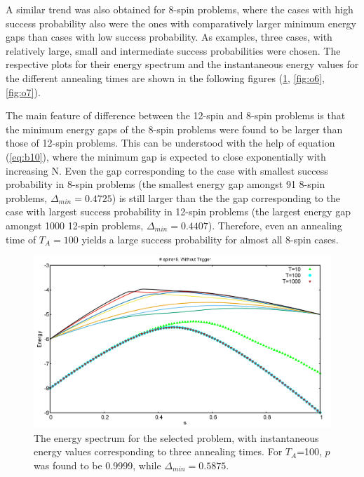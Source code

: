 \documentclass[../main.tex]{subfiles}
\begin{document}
\newpage
A similar trend was also obtained for 8-spin problems, where the cases with high success probability also were the ones with comparatively larger minimum energy gaps than cases with low success probability.  As examples, three cases, with relatively large, small and intermediate success probabilities were chosen. The respective plots for their energy spectrum and the instantaneous energy values for the different annealing times are shown in the following figures (\ref{fig:o5}, \ref{fig:o6}, \ref{fig:o7}).

The main feature of difference between the 12-spin and 8-spin problems is that the minimum energy gaps of the 8-spin problems were found to be larger than those of 12-spin problems. This can be understood with the help of equation (\ref{eq:b10}), where the minimum gap is expected to close exponentially with increasing N. Even the gap corresponding to the case with smallest success probability in 8-spin problems (the smallest energy gap amongst 91 8-spin problems, $\Delta_{min}=0.4725$) is still larger than the the gap corresponding to the case with largest success probability in 12-spin problems (the largest energy gap amongst 1000 12-spin problems, $\Delta_{min}=0.4407$). Therefore, even an annealing time of $T_A=100$ yields a large success probability for almost all 8-spin cases. 
\begin{figure}[H]
\centering 
\includegraphics[scale=0.3]{98_s8_O.png}
\caption{The energy spectrum for the selected problem, with instantaneous energy values corresponding to three annealing times. For $T_A$=100, $p$ was found to be 0.9999, while $\Delta_{min}=0.5875$.}
\label{fig:o5}
\end{figure}
\end{document}
